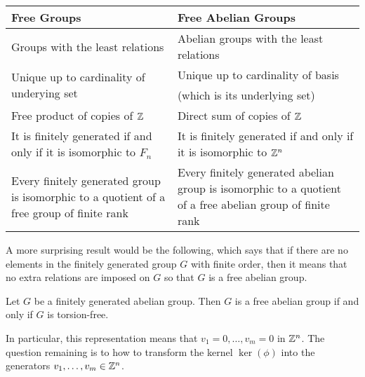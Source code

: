 \documentclass[a4paper]{article}
\begin{document}
\begin{table}[!ht]
\centering
\begin{tabular}{p{8cm}|p{8cm}}
Free Groups                                                                               & Free Abelian Groups                                                                                       \\[1.5ex] \hline\hline
Groups with the least relations                                                           & Abelian groups with the least relations                                                                   \\[1.5ex]\hline
\multirow{2}{*}{Unique up to cardinality of underying set}                                & Unique up to cardinality of basis                                                                         \\
                                                                                          & (which is its underlying set)                                                                             \\\hline
Free product of copies of $\mathbb{Z}$                                                         & Direct sum of copies of $\mathbb{Z}$                                                                              \\[1.5ex]\hline
It is finitely generated if and only if it is isomorphic to $F_n$                         & It is finitely generated if and only if it is isomorphic to $\mathbb{Z}^n$                                        \\[1.5ex]\hline
Every finitely generated group is isomorphic to a quotient of a free group of finite rank & Every finitely generated abelian group is isomorphic to a quotient of a free abelian group of finite rank
\end{tabular}
\end{table}

A more surprising result would be the following, which says that if there are no elements in the finitely generated group $G$ with finite order, then it means that no extra relations are imposed on $G$ so that $G$ is a free abelian group. 

\begin{prp}{}{} Let $G$ be a finitely generated abelian group. Then $G$ is a free abelian group if and only if $G$ is torsion-free. 
\end{prp}

In particular, this representation means that $v_1=0,\dots,v_m=0$ in $\mathbb{Z}^n$. The question remaining is to how to transform the kernel $\ker(\phi)$ into the generators $v_1,\dots,v_m\in\mathbb{Z}^n$. 
\end{document}
